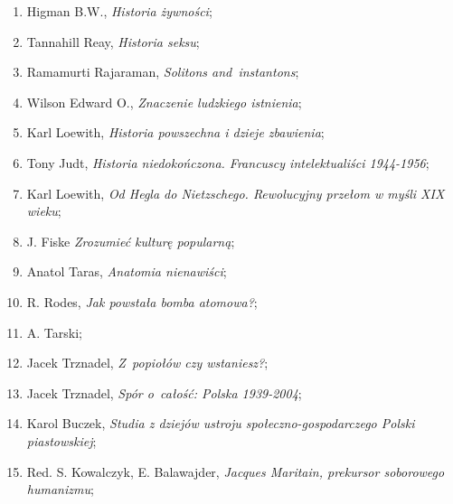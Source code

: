 \documentclass[a4paper,11pt]{article}
\begin{document}
\begin{enumerate}
\item Higman B.W., \textit{Historia żywności};



\item Tannahill Reay, \textit{Historia seksu};



\item Ramamurti Rajaraman, \textit{Solitons and~instantons};



\item Wilson Edward O., \textit{Znaczenie ludzkiego istnienia};



\item Karl Loewith, \textit{Historia powszechna i dzieje zbawienia};



\item Tony Judt, \textit{Historia niedokończona. Francuscy
    intelektualiści 1944-1956};



\item Karl Loewith, \textit{Od Hegla do Nietzschego. Rewolucyjny przełom
    w myśli XIX wieku};



\item J. Fiske \textit{Zrozumieć kulturę popularną};



\item Anatol Taras, \textit{Anatomia nienawiści};



\item R. Rodes, \textit{Jak powstała bomba atomowa?};



\item A. Tarski;



\item Jacek Trznadel, \textit{Z~popiołów czy wstaniesz?};



\item Jacek Trznadel, \textit{Spór o~całość: Polska 1939-2004};



\item Karol Buczek, \textit{Studia z dziejów ustroju
    społeczno-gospodarczego Polski piastowskiej};



\item Red. S. Kowalczyk, E. Balawajder, \textit{Jacques Maritain,
    prekursor soborowego humanizmu};




\end{enumerate}
\end{document}
